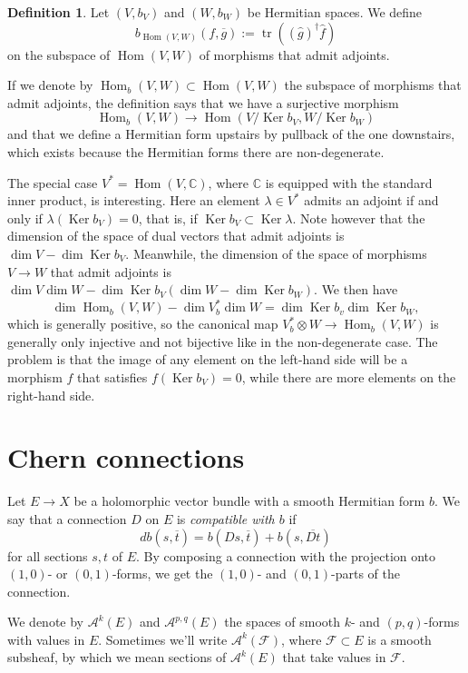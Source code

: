 \documentclass[10pt,a4paper]{amsart}
\theoremstyle{definition}
\newtheorem{defi}[theo]{Definition}
\newcommand{\kk}[1]{\mathbb{#1}}
\newcommand{\cc}[1]{\mathcal{#1}}
\def\ov#1{\overline{#1}}
\DeclareMathOperator{\Ker}{Ker}
\DeclareMathOperator{\Hom}{Hom}
\DeclareMathOperator{\tr}{tr}
\begin{document}
\begin{defi}
Let $(V,b_V)$ and $(W,b_W)$ be Hermitian spaces. We define
\[
b_{\Hom(V,W)}(f, \ov g) := \tr((\hat g)^\dagger \hat f)
\]
on the subspace of $\Hom(V,W)$ of morphisms that admit adjoints.
\end{defi}

If we denote by $\Hom_b(V,W) \subset \Hom(V,W)$ the subspace of morphisms that admit adjoints, the definition says that we have a surjective morphism
\[
\Hom_b(V,W) \to \Hom(V/\Ker b_V, W/\Ker b_W)
\]
and that we define a Hermitian form upstairs by pullback of the one downstairs, which exists because the Hermitian forms there are non-degenerate.

The special case $V^* = \Hom(V, \kk C)$, where $\kk C$ is equipped with the
standard inner product, is interesting.
Here an element $\lambda \in V^*$ admits an adjoint if and only if $\lambda(\Ker b_V)
= 0$, that is, if $\Ker b_V \subset \Ker \lambda$.
Note however that the dimension of the space of dual vectors that admit adjoints
is $\dim V - \dim \Ker b_V$.
Meanwhile, the dimension of the space of morphisms $V \to W$ that admit adjoints
is $\dim V \dim W - \dim \Ker b_V (\dim W - \dim \Ker b_W)$.
We then have
$$
\dim \Hom_b(V, W)
- \dim V^*_b \dim W
= \dim \Ker b_v \dim \Ker b_W,
$$
which is generally positive, so the canonical map $V_b^* \otimes W \to \Hom_b(V,
W)$ is generally only injective and not bijective like in the non-degenerate
case.
The problem is that the image of any element on the left-hand side will be a
morphism $f$ that satisfies $f(\Ker b_V) = 0$, while there are more elements on
the right-hand side.


\section{Chern connections}
\label{sec:degenerate-chern-connections}



Let $E \to X$ be a holomorphic vector bundle with a smooth Hermitian form $b$.
We say that a connection $D$ on $E$ is \emph{compatible with $b$} if
\[
d b(s, \ov t) = b(Ds, \ov t) + b(s, \ov{Dt})
\]
for all sections $s, t$ of $E$. By composing a connection with the projection
onto $(1,0)$- or $(0,1)$-forms, we get the $(1,0)$- and $(0,1)$-parts of the
connection.

We denote by $\cc A^k(E)$ and $\cc A^{p,q}(E)$ the spaces of smooth $k$- and
$(p,q)$-forms with values in $E$. Sometimes we'll write $\cc A^k(\cc F)$, where
$\cc F \subset E$ is a smooth subsheaf, by which we mean sections of $\cc
A^k(E)$ that take values in $\cc F$.
\end{document}
